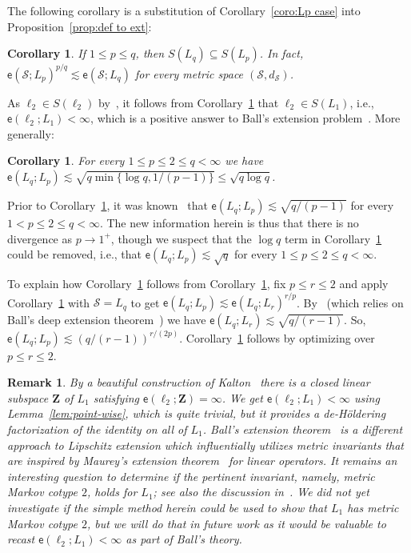 \documentclass[11pt,reqno]{amsart}
\newtheorem{corollary}[theorem]{Corollary}
\newtheorem{remark}[theorem]{Remark}
\renewcommand{\le}{\leqslant}
\renewcommand{\subset}{\subseteq}
\newcommand{\ee}{\mathsf{e}}
\renewcommand{\SS}{\mathscr{S}}
\newcommand{\bZ}{\mathbf{Z}}
\begin{document}
The following corollary is a substitution of Corollary~\ref{coro:Lp case}  into Proposition~\ref{prop:def to ext}: 

\begin{corollary}\label{cor:extension monotonicity} If $1\le p\le q$, then $S(L_q)\subset S(L_p)$.  In fact, $\ee(\SS;L_p)^{p/q}\lesssim \ee(\SS;L_q)$ for every metric space $(\SS,d_\SS)$.
\end{corollary}

As $\ell_2\in S(\ell_2)$ by~\cite{Kir34}, it follows from Corollary~\ref{cor:extension monotonicity} that $\ell_2\in S(L_1)$, i.e., $\ee(\ell_2;L_1)<\infty$, which is a positive answer to Ball's extension problem~\cite{Bal92}. More generally:

\begin{corollary}\label{thm:endpoint NPSS} For every $1\le p\le 2\le q<\infty$ we have $\ee(L_q;L_p)\lesssim \sqrt{q\min\{\log q, 1/(p-1)\}}\le\sqrt{q\log q}$.
\end{corollary}
Prior to Corollary~\ref{thm:endpoint NPSS}, it was known~\cite{NPSS06}  that $\ee(L_q;L_p)\lesssim \sqrt{q/(p-1)}$ for every $1<p\le 2\le q<\infty$. The new information  herein is thus that there is no divergence as $p\to 1^+$, though we suspect that the $\log q$ term in  Corollary~\ref{thm:endpoint NPSS} could be removed, i.e., that $\ee(L_q;L_p)\lesssim \sqrt{q}$ for every $1\le p\le 2\le q<\infty$. 

To explain how  Corollary~\ref{thm:endpoint NPSS}  follows from Corollary~\ref{cor:extension monotonicity},  fix $p\le r\le 2$ and apply Corollary~\ref{cor:extension monotonicity} with $\SS=L_q$ to get $\ee(L_q;L_p)\lesssim \ee(L_q;L_r)^{r/p}$. By~\cite{NPSS06} (which relies on Ball's deep extension theorem~\cite{Bal92}) we have  $\ee(L_q;L_r)\lesssim \sqrt{q/(r-1)}$. So, $\ee(L_q;L_p)\lesssim (q/(r-1))^{r/(2p)}$. Corollary~\ref{thm:endpoint NPSS} follows by optimizing over $p\le r\le 2$. 


\begin{remark}\label{rem:Mcotype} {\em By a beautiful construction of Kalton~\cite{Kal12} there is a closed linear subspace $\bZ$ of $L_1$ satisfying $\ee(\ell_2;\bZ)=\infty$. We get $\ee(\ell_2;L_1)<\infty$  using  Lemma~\ref{lem:point-wise}, which is quite trivial, but it provides  a de-H\"oldering factorization of the identity on all of $L_1$. Ball's extension theorem~\cite{Bal92} is a different approach to Lipschitz extension which influentially utilizes metric invariants that are inspired by Maurey's extension theorem~\cite{Mau74} for linear operators. It remains an interesting question to determine if the pertinent invariant, namely, metric Markov cotype $2$,  holds for $L_1$; see also the discussion in~\cite{MN13}. We did not yet investigate if the simple method herein could be used to show that $L_1$ has metric Markov cotype $2$, but we will  do that in future work as it would be valuable to recast $\ee(\ell_2;L_1)<\infty$ as part of Ball's theory. } 
\end{remark}
\end{document}
